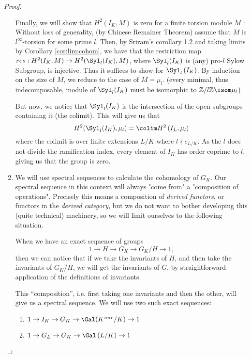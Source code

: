 \begin{proof}
\begin{enumerate}[(1)]
			Finally, we will show that \(H^{2}(I_{K},M)\) is zero 
			for a finite torsion module \(M\) :
			Without loss of generality, (by Chinese Remainer Theorem)
			assume that \(M\) is \(l^{\infty}\)-torsion for some prime 
			\(l\).
			Then, by Sriram's corollary 1.2 and taking limits by
			Corollary \ref{cor:lim:cohom}, we have that the restriction
			map \(res : H^{2}(I_{K},M) \to H^{2}(\Syl_{l}(I_{K}),M)\),
			where \(\Syl_{l}(I_{K})\) is (any) pro-\(l\) Sylow Subgroup,
			is injective. 
			Thus it suffices to show for \(\Syl_{l}\left( I_{K} \right)\).
			By induction on the size of \(M\), we reduce to the case of
			\(M = \mu_{l}\).
			(every minimal, thus indecomposable, module of 
			\(\Syl_{l}(I_{K})\) must be isomorphic to
			\(\mathbb{Z} / l\mathbb{Z} \isom \mu_{l}\))

			But now, we notice that \(\Syl_{l}(I_{K})\) is the intersection
			of the open subgroups containing it (the colimit). 
			This will give us that
			\[
				H^{2}(\Syl_{l}(I_{K}),\mu_{l}) = 
				\colim H^{2}\left( I_{L},\mu_{l} \right)
			\] 
			where the colimit is over finite extensions \(L / K\) where
			\(l \nmid e_{L / K}\).
			As the \(l\) does not divide the ramification index, every
			element of \(I_{K}\) has order coprime to \(l\), giving us that 
			the group is zero.

		\item
			We will use spectral sequences to calculate the cohomology
			of \(G_{K}\). 
			Our spectral sequence in this context will always "come from"
			a "composition of operations".
			Precisely this means a composition of \textit{derived functors},
			or functors in the \textit{derived category}, but we do
			not want to bother developing this (quite technical)
			machinery, so we will limit ourselves to the following situation.

			When we have an exact sequence of groups
			\[
			1 \to H \to G_{K} \to G_{K} / H \to 1	
			,\] 
			then we can notice that if we take the invariants of \(H\), and
			then take the invariants of \(G_{K} / H\), we will get
			the invariants of \(G\), by straightforward application of
			the definitions of invariants.

			This ``composition'', i.e. first taking one invariants and 
			then the other, will give us a spectral sequence.
			We will use two such exact sequences:
			\begin{enumerate}[(1)]
				\item \(1 \to I_{K} \to G_{K} \to \Gal(K^{unr} / K) \to 1\) 
				\item \(1 \to G_{L} \to G_{K} \to \Gal\left( L / K \right) \to 1\) 


\end{enumerate}
\end{enumerate}
\end{proof}
